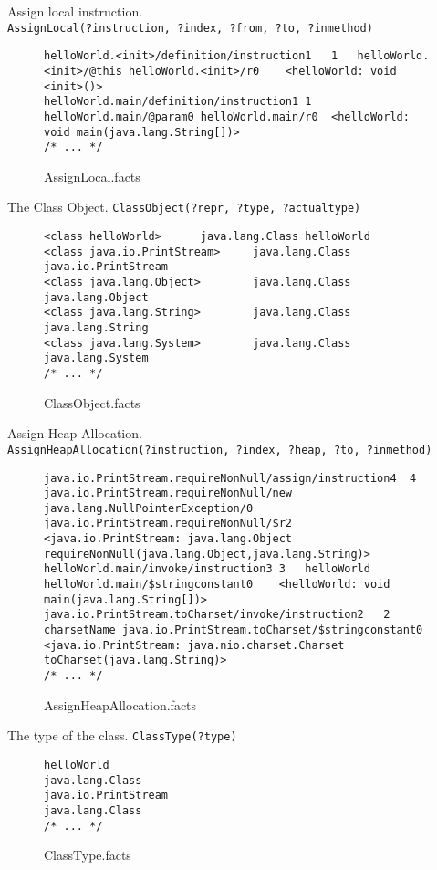 \documentclass{dithesis}
\begin{document}
        Assign local instruction.\\
        \texttt{AssignLocal(?instruction, ?index, ?from, ?to, ?inmethod)}
        \begin{figure}[H]
\begin{lstlisting}
helloWorld.<init>/definition/instruction1   1   helloWorld.<init>/@this helloWorld.<init>/r0    <helloWorld: void <init>()>
helloWorld.main/definition/instruction1 1   helloWorld.main/@param0 helloWorld.main/r0  <helloWorld: void main(java.lang.String[])>
/* ... */
\end{lstlisting}
\caption{AssignLocal.facts}
        \end{figure}


        The Class Object. \texttt{ClassObject(?repr, ?type, ?actualtype)}
        \begin{figure}[H]
\begin{lstlisting}
<class helloWorld>      java.lang.Class helloWorld
<class java.io.PrintStream>     java.lang.Class java.io.PrintStream
<class java.lang.Object>        java.lang.Class java.lang.Object
<class java.lang.String>        java.lang.Class java.lang.String
<class java.lang.System>        java.lang.Class java.lang.System
/* ... */
\end{lstlisting}
\caption{ClassObject.facts}
        \end{figure}


        Assign Heap Allocation.\\
        \texttt{AssignHeapAllocation(?instruction, ?index, ?heap, ?to, ?inmethod)}
        \begin{figure}[H]
\begin{lstlisting}
java.io.PrintStream.requireNonNull/assign/instruction4  4   java.io.PrintStream.requireNonNull/new java.lang.NullPointerException/0 java.io.PrintStream.requireNonNull/$r2  <java.io.PrintStream: java.lang.Object requireNonNull(java.lang.Object,java.lang.String)>
helloWorld.main/invoke/instruction3 3   helloWorld  helloWorld.main/$stringconstant0    <helloWorld: void main(java.lang.String[])>
java.io.PrintStream.toCharset/invoke/instruction2   2   charsetName java.io.PrintStream.toCharset/$stringconstant0  <java.io.PrintStream: java.nio.charset.Charset toCharset(java.lang.String)>
/* ... */
\end{lstlisting}
\caption{AssignHeapAllocation.facts}
        \end{figure}


        The type of the class. \texttt{ClassType(?type)}
        \begin{figure}[H]
\begin{lstlisting}
helloWorld
java.lang.Class
java.io.PrintStream
java.lang.Class
/* ... */
\end{lstlisting}
\caption{ClassType.facts}
        \end{figure}
\end{document}
